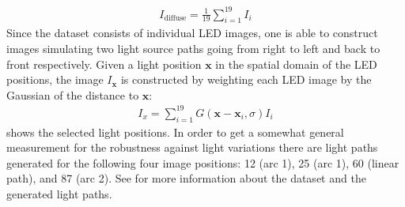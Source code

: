\documentclass[thesis.tex]{subfiles}
\begin{document}
\begin{align}
	I_{\text{diffuse}} = \frac{1}{19} \sum_{i = 1}^{19} I_{i}
\end{align}
Since the dataset consists of individual LED images, one is able to construct images simulating two light source paths going from right to left and back to front respectively.
Given a light position ${\boldsymbol{x}}$ in the spatial domain of the LED positions, the image $I_{\boldsymbol{x}}$ is constructed by weighting each LED image by the Gaussian of the distance to ${\boldsymbol{x}}$:
\begin{align}
	I_{x} = \sum_{i = 1}^{19} G(\boldsymbol{x} - \boldsymbol{x}_i,\sigma) I_{i}
\end{align}
 shows the selected light positions. In order to get a somewhat general measurement for the robustness against light variations there are light paths generated for the following four image positions: 12 (arc 1), 25 (arc 1), 60 (linear path), and 87 (arc 2).
See \citet{aanaes2010recall,aanaes2010ground} for more information about the dataset and the generated light paths.
\end{document}
